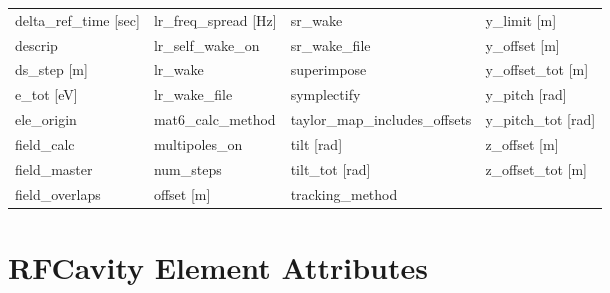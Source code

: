 \begin{tabular}{llll}
delta_ref_time [sec]             & lr_freq_spread [Hz]              & sr_wake                          & y_limit [m]                      \\
descrip                          & lr_self_wake_on                  & sr_wake_file                     & y_offset [m]                     \\
ds_step [m]                      & lr_wake                          & superimpose                      & y_offset_tot [m]                 \\
e_tot [eV]                       & lr_wake_file                     & symplectify                      & y_pitch [rad]                    \\
ele_origin                       & mat6_calc_method                 & taylor_map_includes_offsets      & y_pitch_tot [rad]                \\
field_calc                       & multipoles_on                    & tilt [rad]                       & z_offset [m]                     \\
field_master                     & num_steps                        & tilt_tot [rad]                   & z_offset_tot [m]                 \\
field_overlaps                   & offset [m]                       & tracking_method                  &                                  \\
 \bottomrule
 \end{tabular}
 \vfill
 
 \section{RFCavity Element Attributes}
 \label{s:list.rfcavity}
 
